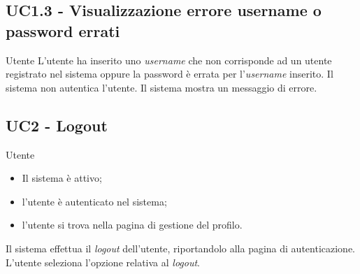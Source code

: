 \subsection{UC1.3 - Visualizzazione errore username o password errati}
\label{1.3}
\makeUC{}
{Utente}
{L'utente ha inserito uno \textit{username} che non corrisponde ad un utente registrato nel sistema 
oppure la password è errata per l'\textit{username} inserito.}
{Il sistema non autentica l'utente.}
{Il sistema mostra un messaggio di errore.}{}{}{}{}

\subsection{UC2 - Logout}
\label{2}
{Utente}
{
    \begin{itemize}
        \item Il sistema è attivo;
        \item l'utente è autenticato nel sistema;
        \item l'utente si trova nella pagina di gestione del profilo.
    \end{itemize}
}
{Il sistema effettua il \textit{logout} dell'utente, riportandolo alla pagina di autenticazione.}
{L'utente seleziona l'opzione relativa al \textit{logout}.}{}{}{}{}

